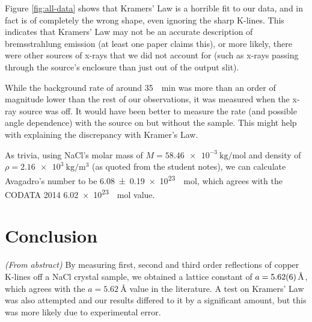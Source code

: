 \documentclass[a4paper]{scrartcl}
\begin{document}
Figure \ref{fig:all-data} shows that Kramers' Law is a horrible fit to our data, and in fact is of completely the wrong shape, even ignoring the sharp K-lines. This indicates that Kramers' Law may not be an accurate description of bremsstrahlung emission (at least one paper\cite{Laguitton1977} claims this), or more likely, there were other sources of x-rays that we did not account for (such as x-rays passing through the source's enclosure than just out of the output slit).

While the background rate of around \SI{35}{\per\minute} was more than an order of magnitude lower than the rest of our observations, it was measured when the x-ray source was off. It would have been better to measure the rate (and possible angle dependence) with the source on but without the sample. This might help with explaining the discrepancy with Kramer's Law.

As trivia, using NaCl's molar mass of \(M = \SI{58.46e-3}{\kilo\gram\per\mole}\) and density of \(\rho = \SI{2.16e3}{\kilo\gram\per\metre\cubed}\) (as quoted from the student notes), we can calculate Avagadro's number to be \SI{6.08 \pm 0.19e23}{\per\mole}, which agrees with the CODATA 2014 \SI{6.02e23}{\per\mole} value.

\section{Conclusion}
\emph{(From abstract)} By measuring first, second and third order reflections of copper K-lines off a NaCl crystal sample, we obtained a lattice constant of \(a = \SI{5.62 \pm 0.06}{\angstrom}\), which agrees with the \(a = \SI{5.62}{\angstrom}\) value in the literature\cite{Mott1940}. A test on Kramers' Law was also attempted and our results differed to it by a significant amount, but this was more likely due to experimental error.

\printbibliography
\end{document}
